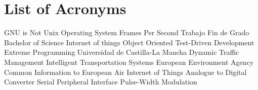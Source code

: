 \chapter{List of Acronyms} %

{\small
\begin{acronym}[XXXXXXXX]
	     	{\acs{GNU} is Not Unix}
			{Operating System}
			{Frames Per Second}
			{Trabajo Fin de Grado}
			{Bachelor of Science}
			{Internet of things}
			{Object Oriented}
			{Test-Driven Development}
			{Extreme Programming}
			{Universidad de Castilla-La Mancha}
			{Dynamic Traffic Management}
			{Intelligent Transportation Systems}
			{European Environment Agency}
		{Common Information to European Air}
	 		{Internet of Things}
			{Analogue to Digital Converter}
			{Serial Peripheral Interface}
			{Pulse-Width Modulation}
\end{acronym}
}




